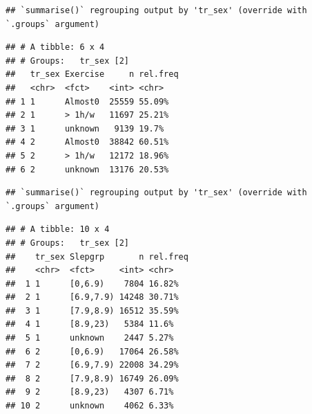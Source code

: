 \documentclass[
]{article}
\newenvironment{Shaded}{\begin{snugshade}}{\end{snugshade}}
\newcommand{\DataTypeTok}[1]{\textcolor[rgb]{0.13,0.29,0.53}{#1}}
\newcommand{\DecValTok}[1]{\textcolor[rgb]{0.00,0.00,0.81}{#1}}
\newcommand{\KeywordTok}[1]{\textcolor[rgb]{0.13,0.29,0.53}{\textbf{#1}}}
\newcommand{\NormalTok}[1]{#1}
\newcommand{\OperatorTok}[1]{\textcolor[rgb]{0.81,0.36,0.00}{\textbf{#1}}}
\newcommand{\OtherTok}[1]{\textcolor[rgb]{0.56,0.35,0.01}{#1}}
\newcommand{\StringTok}[1]{\textcolor[rgb]{0.31,0.60,0.02}{#1}}
\begin{document}
\begin{verbatim}
## `summarise()` regrouping output by 'tr_sex' (override with `.groups` argument)
\end{verbatim}

\begin{verbatim}
## # A tibble: 6 x 4
## # Groups:   tr_sex [2]
##   tr_sex Exercise     n rel.freq
##   <chr>  <fct>    <int> <chr>   
## 1 1      Almost0  25559 55.09%  
## 2 1      > 1h/w   11697 25.21%  
## 3 1      unknown   9139 19.7%   
## 4 2      Almost0  38842 60.51%  
## 5 2      > 1h/w   12172 18.96%  
## 6 2      unknown  13176 20.53%
\end{verbatim}

\begin{Shaded}
\end{Shaded}

\begin{verbatim}
## `summarise()` regrouping output by 'tr_sex' (override with `.groups` argument)
\end{verbatim}

\begin{verbatim}
## # A tibble: 10 x 4
## # Groups:   tr_sex [2]
##    tr_sex Slepgrp       n rel.freq
##    <chr>  <fct>     <int> <chr>   
##  1 1      [0,6.9)    7804 16.82%  
##  2 1      [6.9,7.9) 14248 30.71%  
##  3 1      [7.9,8.9) 16512 35.59%  
##  4 1      [8.9,23)   5384 11.6%   
##  5 1      unknown    2447 5.27%   
##  6 2      [0,6.9)   17064 26.58%  
##  7 2      [6.9,7.9) 22008 34.29%  
##  8 2      [7.9,8.9) 16749 26.09%  
##  9 2      [8.9,23)   4307 6.71%   
## 10 2      unknown    4062 6.33%
\end{verbatim}
\end{document}
